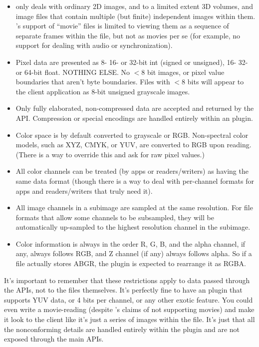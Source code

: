 \begin{itemize}
  \item \product only deals with ordinary 2D images, and to a limited
    extent 3D volumes, and image files that contain multiple (but
    finite) independent images within them.  \product's support of ``movie''
    files is limited to viewing them as a sequence of separate frames within
    the file, but not as movies per se (for example, no support for dealing
    with audio or synchronization).

  \item Pixel data are presented as 8- 16- or 32-bit int (signed or unsigned), 16-
    32- or 64-bit float.  NOTHING ELSE.  No $<8$ bit images, or pixel value
    boundaries that aren't byte boundaries.  Files with $<8$ bits will
    appear to the client application as 8-bit unsigned grayscale images.

  \item Only fully elaborated, non-compressed data are accepted
    and returned by the API.  Compression or special encodings are
    handled entirely within an \product plugin.

  \item Color space is by default converted to grayscale or RGB. Non-spectral
    color models, such as
    XYZ, CMYK, or YUV, are converted to RGB upon reading. (There is a
    way to override this and ask for raw pixel values.)

  \item All color channels can be treated (by apps or readers/writers)
    as having the same data format (though there is a way to deal with
    per-channel formats for apps and readers/writers that truly need
    it).

  \item All image channels in a subimage are sampled at the same
    resolution.  For file formats that allow some channels to be
    subsampled, they will be automatically up-sampled to the highest
    resolution channel in the subimage.

  \item Color information is always in the order R, G, B, and the alpha
    channel, if any, always follows RGB, and Z channel (if any) always
    follows alpha.  So if a file actually stores ABGR, the plugin is
    expected to rearrange it as RGBA.

\end{itemize}

It's important to remember that these restrictions apply to data passed
through the APIs, not to the files themselves.  It's perfectly fine to
have an \product plugin that supports YUV data, or 4 bits per channel, or
any other exotic feature.  You could even write a movie-reading
\ImageInput (despite \product's claims of not supporting movies) and
make it look to the client like it's just a series of images within the
file.  It's just that all the nonconforming details are handled entirely
within the \product plugin and are not exposed through the main \product
APIs.


